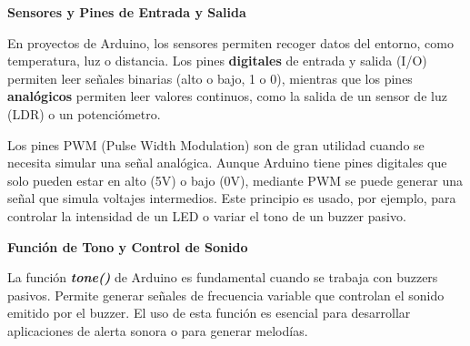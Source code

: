 \textbf{Sensores y Pines de Entrada y Salida}

En proyectos de Arduino, los sensores permiten recoger datos del entorno, como temperatura, luz o distancia. Los pines \textbf{digitales} de entrada y salida (I/O) permiten leer señales binarias (alto o bajo, 1 o 0), mientras que los pines \textbf{analógicos} permiten leer valores continuos, como la salida de un sensor de luz (LDR) o un potenciómetro.

Los pines PWM (Pulse Width Modulation) son de gran utilidad cuando se necesita simular una señal analógica. Aunque Arduino tiene pines digitales que solo pueden estar en alto (5V) o bajo (0V), mediante PWM se puede generar una señal que simula voltajes intermedios. Este principio es usado, por ejemplo, para controlar la intensidad de un LED o variar el tono de un buzzer pasivo.

\textbf{Función de Tono y Control de Sonido}

La función \emph{\textbf{tone()}} de Arduino es fundamental cuando se trabaja con buzzers pasivos. Permite generar señales de frecuencia variable que controlan el sonido emitido por el buzzer. El uso de esta función es esencial para desarrollar aplicaciones de alerta sonora o para generar melodías.